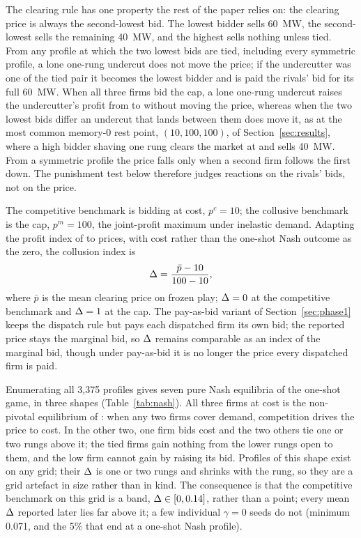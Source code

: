 The clearing rule has one property the rest of the paper relies on: the clearing price is always the second-lowest bid. The lowest bidder sells 60~MW, the second-lowest sells the remaining 40~MW, and the highest sells nothing unless tied. From any profile at which the two lowest bids are tied, including every symmetric profile, a lone one-rung undercut does not move the price; if the undercutter was one of the tied pair it becomes the lowest bidder and is paid the rivals' bid for its full 60~MW. When all three firms bid the cap, a lone one-rung undercut raises the undercutter's profit from  to  without moving the price, whereas when the two lowest bids differ an undercut that lands between them does move it, as at the most common memory-0 rest point, $(10, 100, 100)$, of Section~\ref{sec:results}, where a high bidder shaving one rung clears the market at  and sells 40~MW. From a symmetric profile the price falls only when a second firm follows the first down. The punishment test below therefore judges reactions on the rivals' bids, not on the price.

The competitive benchmark is bidding at cost, $p^{c} = 10$; the collusive benchmark is the cap, $p^{m} = 100$, the joint-profit maximum under inelastic demand. Adapting the profit index of \citet{calvano2020} to prices, with cost rather than the one-shot Nash outcome as the zero, the collusion index is
\begin{equation}
\Delta = \frac{\bar p - 10}{100 - 10},
\end{equation}
where $\bar p$ is the mean clearing price on frozen play; $\Delta = 0$ at the competitive benchmark and $\Delta = 1$ at the cap. The pay-as-bid variant of Section~\ref{sec:phase1} keeps the dispatch rule but pays each dispatched firm its own bid; the reported price stays the marginal bid, so $\Delta$ remains comparable as an index of the marginal bid, though under pay-as-bid it is no longer the price every dispatched firm is paid.

Enumerating all 3,375 profiles gives seven pure Nash equilibria of the one-shot game, in three shapes (Table~\ref{tab:nash}). All three firms at cost is the non-pivotal equilibrium of \citet{vonderfehr1993}: when any two firms cover demand, competition drives the price to cost. In the other two, one firm bids cost and the two others tie one or two rungs above it; the tied firms gain nothing from the lower rungs open to them, and the low firm cannot gain by raising its bid. Profiles of this shape exist on any grid; their $\Delta$ is one or two rungs and shrinks with the rung, so they are a grid artefact in size rather than in kind. The consequence is that the competitive benchmark on this grid is a band, $\Delta \in [0, 0.14]$, rather than a point; every mean $\Delta$ reported later lies far above it; a few individual $\gamma = 0$ seeds do not (minimum 0.071, and the 5\% that end at a one-shot Nash profile).

